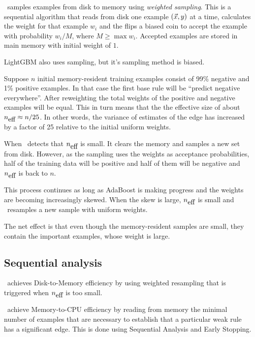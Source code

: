 \Sparrow\ samples examples from disk to memory using {\em weighted
  sampling}. This is a sequential algorithm that reads from disk one
example $(\vec{x},y)$ at a time, calculates the weight for that example
$w_i$ and the flips a biased coin to accept the example with
probability $w_i/M$, where $M\geq \max w_i$. Accepted examples are
stored in main memory with initial weight of $1$.

LightGBM also uses sampling, but it's sampling method is biased.

Suppose $n$ initial memory-resident training examples consist of 99\%
negative and 1\% positive examples. In that case the first base rule
will be ``predict negative everywhere''. After reweighting the total
weights of the positive and negative examples will be equal. This in
turn means that the the effective size of about ${n_{\mbox{eff}}} \approx
n/25$. In other words, the variance of estimates of the edge has
increased by a factor of 25 relative to the initial uniform weights.

When \Sparrow\ detects that ${n_{\mbox{eff}}}$ is small. It clears the memory and
samples a new set from disk. However, as the sampling uses the weights
as acceptance probabilities, half of the training data will be
positive and half of them will be negative and ${n_{\mbox{eff}}}$ is back to $n$.

This process continues as long as AdaBoost is making progress and the
weights are becoming increasingly skewed. When the skew is large,
${n_{\mbox{eff}}}$ is small and \Sparrow\ resamples a new sample with uniform
weights.

The net effect is that even though the memory-resident samples are
small, they contain the important examples, whose weight is large.


\subsection{Sequential analysis}

\Sparrow\ achieves Disk-to-Memory efficiency by using weighted
resampling that is triggered when ${n_{\mbox{eff}}}$ is too small.

\Sparrow\ achieve Memory-to-CPU efficiency by reading from memory the
minimal number of examples that are necessary to establish that a
particular weak rule has a significant edge. This is done using
Sequential Analysis and Early Stopping.

